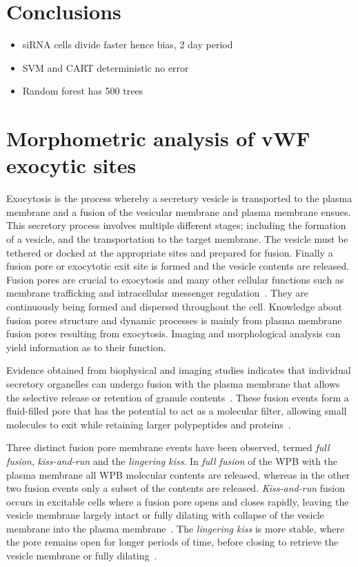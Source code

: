 \section{Conclusions}
\begin{itemize}
	\item siRNA cells divide faster hence bias, 2 day period
	\item SVM and CART deterministic no error
	\item Random forest has 500 trees
\end{itemize}


\section{Morphometric analysis of vWF exocytic sites}
Exocytosis is the process whereby a secretory vesicle is transported to the plasma membrane and a fusion of the vesicular membrane and plasma membrane ensues. This secretory process involves multiple different stages; including the formation of a vesicle, and the transportation to the target membrane. The vesicle must be tethered or docked at the appropriate sites and prepared for fusion. Finally a fusion pore or exocytotic exit site is formed and the vesicle contents are released. Fusion pores are crucial to exocytosis and many other cellular functions such as membrane trafficking and intracellular messenger regulation~\cite{Lindau2003}. They are continuously being formed and dispersed throughout the cell. Knowledge about fusion pores structure and dynamic processes is mainly from plasma membrane fusion pores resulting from exocytosis. Imaging and morphological analysis can yield information as to their function.

Evidence obtained from biophysical and imaging studies indicates that individual secretory organelles can undergo fusion with the plasma membrane that allows the selective release or retention of granule contents~\cite{Babich2008}. These fusion events form a fluid-filled pore that has the potential to act as a molecular filter, allowing small molecules to exit while retaining larger polypeptides and proteins~\cite{MacDonald2006}.

Three distinct fusion pore membrane events have been observed, termed \emph{full fusion}, \emph{kiss-and-run} and the \emph{lingering kiss}. In \emph{full fusion} of the WPB with the plasma membrane all WPB molecular contents are released, whereas in the other two fusion events only a subset of the contents are released. \emph{Kiss-and-run} fusion occurs in excitable cells where a fusion pore opens and closes rapidly, leaving the vesicle membrane largely intact or fully dilating with collapse of the vesicle membrane into the plasma membrane~\cite{Lindau2003}. The \emph{lingering kiss} is more stable, where the pore remains open for longer periods of time, before closing to retrieve the vesicle membrane or fully dilating~\cite{Fernandez-Chacon1995}.

